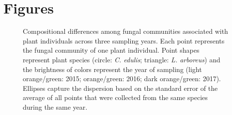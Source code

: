 %
%



\newpage
\section{Figures}
\begin{figure}[h]
	\centering
	\caption[Compositional differences among fungal communities associated with plant individuals across three sampling years.]
		{\hspace{1mm} Compositional differences among fungal communities associated with plant individuals across three sampling years. Each point represents the fungal community of one plant individual. Point shapes represent plant species (circle: \textit{C. edulis}; triangle: \textit{L. arboreus}) and the brightness of colors represent the year of sampling (light orange/green: 2015; orange/green: 2016; dark orange/green: 2017). Ellipses capture the dispersion based on the standard error of the average of all points that were collected from the same species during the same year. 
		}
	\label{fig:3YrNMDS_Individual}
\end{figure}



